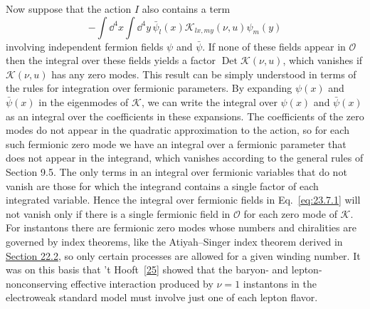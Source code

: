 Now suppose that the action $I$ also contains a term
\[
-\int \dd^4x\int \dd^4y\,
\bar\psi_l(x)\mathcal K_{lx,my}(\nu,u)\psi_m(y)
\]
involving independent fermion fields $\psi$ and $\bar\psi$. If none of
these fields appear in $\mathcal O$ then the integral over these fields
yields a factor $\operatorname{Det}\mathcal K(\nu,u)$, which vanishes if
$\mathcal K(\nu,u)$ has any zero modes. This result can be simply
understood in terms of the rules for integration over fermionic
parameters. By expanding $\psi(x)$ and $\bar\psi(x)$ in the eigenmodes
of $\mathcal K$, we can write the integral over $\psi(x)$ and
$\bar\psi(x)$ as an integral over the coefficients in these expansions.
The coefficients of the zero modes do not appear in the quadratic
approximation to the action, so for each such fermionic zero mode we have
an integral over a fermionic parameter that does not appear in the
integrand, which vanishes according to the general rules of Section 9.5.
The only terms in an integral over fermionic variables that do not vanish
are those for which the integrand contains a single factor of each
integrated variable. Hence the integral over fermionic fields in
Eq.~\eqref{eq:23.7.1} will not vanish only if there is a single fermionic
field in $\mathcal O$ for each zero mode of $\mathcal K$. For instantons
there are fermionic zero modes whose numbers and chiralities are governed
by index theorems, like the Atiyah--Singer index theorem derived in
\hyperref[sec:22.2]{Section 22.2}, so only certain processes are allowed
for a given winding number. It was on this basis that
't Hooft~\hyperref[ch23-ref-25]{[25]} showed that the baryon- and
lepton-nonconserving effective interaction produced by $\nu=1$
instantons in the electroweak standard model must involve just one of
each lepton flavor.
